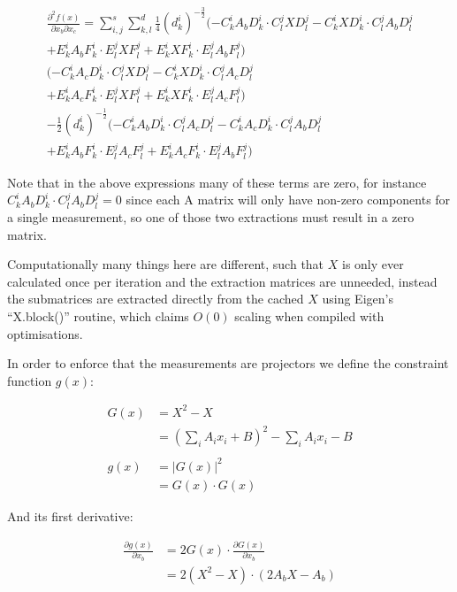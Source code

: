 \documentclass{article}
\begin{document}
\begin{align}
	\frac{\partial^2 f(x)}{\partial x_b \partial x_c} = \sum_{i,j}^s \sum_{k,l}^d \frac{1}{4}(d_k^i)^{-\frac{3}{2}}(-C_k^i A_b D_k^i \cdot C_l^j X D_l^j - C_k^i X D_k^i \cdot C_l^j A_b D_l^j \\
	+ E_k^i A_b F_k^i \cdot E_l^j X F_l^j + E_k^i X F_k^i \cdot E_l^j A_b F_l^j) \\
	(-C_k^i A_c D_k^i \cdot C_l^j X D_l^j - C_k^i X D_k^i \cdot C_l^j A_c D_l^j \\
	+ E_k^i A_c F_k^i \cdot E_l^j X F_l^j + E_k^i X F_k^i \cdot E_l^j A_c F_l^j) \\
	-\frac{1}{2}(d_k^i)^{-\frac{1}{2}}(-C_k^i A_b D_k^i \cdot C_l^j A_c D_l^j - C_k^i A_c D_k^i \cdot C_l^j A_b D_l^j \\
	+ E_k^i A_b F_k^i \cdot E_l^j A_c F_l^j + E_k^i A_c F_k^i \cdot E_l^j A_b F_l^j)
\end{align}

Note that in the above expressions many of these terms are zero, for instance $C_k^i A_b D_k^i \cdot C_l^j A_b D_l^j = 0$ since each A matrix will only have non-zero components for a single measurement, so one of those two extractions must result in a zero matrix.

Computationally many things here are different, such that $X$ is only ever calculated once per iteration and the extraction matrices are unneeded, instead the submatrices are extracted directly from the cached $X$ using Eigen's ``X.block()'' routine, which claims $O(0)$ scaling when compiled with optimisations.

In order to enforce that the measurements are projectors we define the constraint function $g(x)$:

\begin{align}
	G(x) &= X^2 - X \\
	&= \left(\sum_i A_i x_i + B\right)^2 - \sum_i A_i x_i - B \\
	\\
	g(x) &= |G(x)|^2 \\
	&= G(x) \cdot G(x)
\end{align}

And its first derivative:

\begin{align}
	\frac{\partial g(x)}{\partial x_b} &= 2 G(x) \cdot \frac{\partial G(x)}{\partial x_b} \\
									   &= 2 (X^2 - X) \cdot (2 A_b X - A_b)
\end{align}
\end{document}
